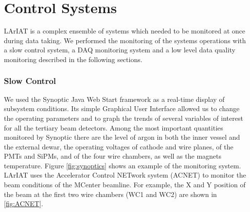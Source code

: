 




\section{Control Systems}
LArIAT is a complex ensemble of systems which needed to be monitored at once during data taking.  We performed the monitoring of the systems operations with a slow control system, a DAQ monitoring system and a low level data quality monitoring described in the following sections.

\subsubsection{Slow Control}
We used the Synoptic Java Web Start framework as a real-time display of subsystem conditions. Its simple 
Graphical User Interface allowed us to change the operating parameters and to graph the trends of several variables of interest for all the tertiary beam detectors.  Among the most important quantities monitored by Synoptic there are the level of argon in both the inner vessel and the external dewar, the operating voltages of cathode and wire planes, of the PMTs and SiPMs, and of the four wire chambers, as well as the magnets temperature. Figure \ref{fig:synoptics} shows an example of the monitoring system.
LArIAT uses the Accelerator Control NETwork system (ACNET) to monitor the beam conditions of the MCenter beamline. For example, the X and Y position of the beam at the first two wire chambers (WC1 and WC2) are shown in \ref{fig:ACNET}. 

